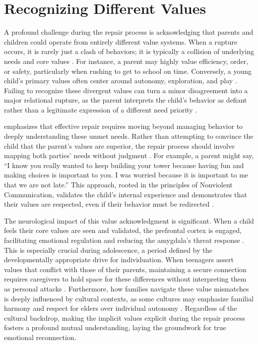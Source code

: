 \section{Recognizing Different Values}

A profound challenge during the repair process is acknowledging that parents and children could operate from entirely different value systems.
When a rupture occurs, it is rarely just a clash of behaviors; it is typically a collision of underlying needs and core values \citep{carlson2024}.
For instance, a parent may highly value efficiency, order, or safety, particularly when rushing to get to school on time.
Conversely, a young child's primary values often center around autonomy, exploration, and play \citep{cohen2026}.
Failing to recognize these divergent values can turn a minor disagreement into a major relational rupture, as the parent interprets the child's behavior as defiant rather than a legitimate expression of a different need priority \citep{fivush2025}.

\citet{hughes2024} emphasizes that effective repair requires moving beyond managing behavior to deeply understanding these unmet needs.
Rather than attempting to convince the child that the parent's values are superior, the repair process should involve mapping both parties' needs without judgment \citep{thompson2026}.
For example, a parent might say, ``I know you really wanted to keep building your tower because having fun and making choices is important to you. 
I was worried because it is important to me that we are not late.''
This approach, rooted in the principles of Nonviolent Communication, validates the child's internal experience and demonstrates that their values are respected, even if their behavior must be redirected \citep{markham2025}.

The neurological impact of this value acknowledgment is significant.
When a child feels their core values are seen and validated, the prefrontal cortex is engaged, facilitating emotional regulation and reducing the amygdala's threat response \citep{bailey2025}.
This is especially crucial during adolescence, a period defined by the developmentally appropriate drive for individuation.
When teenagers assert values that conflict with those of their parents, maintaining a secure connection requires caregivers to hold space for these differences without interpreting them as personal attacks \citep{vaniz2025}.
Furthermore, how families navigate these value mismatches is deeply influenced by cultural contexts, as some cultures may emphasize familial harmony and respect for elders over individual autonomy \citep{stokes2024}.
Regardless of the cultural backdrop, making the implicit values explicit during the repair process fosters a profound mutual understanding, laying the groundwork for true emotional reconnection.

